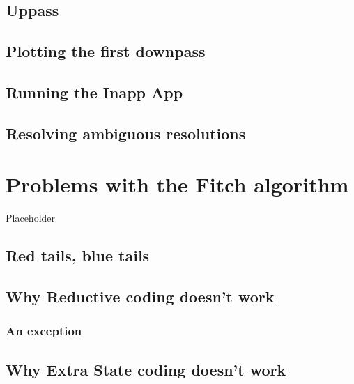 \documentclass[]{book}
\theoremstyle{definition}
\theoremstyle{definition}
\theoremstyle{definition}
\theoremstyle{remark}
\begin{document}
\hypertarget{uppass}{%
\section{Uppass}\label{uppass}}

\hypertarget{plotting-the-first-downpass-1}{%
\section{Plotting the first
downpass}\label{plotting-the-first-downpass-1}}

\hypertarget{running-the-inapp-app}{%
\section{Running the Inapp App}\label{running-the-inapp-app}}

\hypertarget{resolving-ambiguous-resolutions}{%
\section{Resolving ambiguous
resolutions}\label{resolving-ambiguous-resolutions}}

\hypertarget{problems}{%
\chapter{Problems with the Fitch algorithm}\label{problems}}

Placeholder

\hypertarget{red-tails-blue-tails}{%
\section{Red tails, blue tails}\label{red-tails-blue-tails}}

\hypertarget{why-reductive-coding-doesnt-work}{%
\section{Why Reductive coding doesn't
work}\label{why-reductive-coding-doesnt-work}}

\hypertarget{an-exception}{%
\subsection{An exception}\label{an-exception}}

\hypertarget{why-extra-state-coding-doesnt-work}{%
\section{Why Extra State coding doesn't
work}\label{why-extra-state-coding-doesnt-work}}
\end{document}
